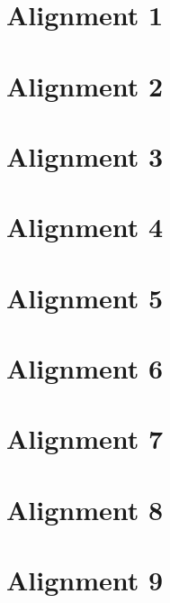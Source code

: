 \documentclass{scrartcl}
\begin{document}
\section{Alignment 1}
\label{sec:align_1}
\clearpage

\section{Alignment 2}
\label{sec:align_2}
\clearpage

\section{Alignment 3}
\label{sec:align_3}
\clearpage

\section{Alignment 4}
\label{sec:align_4}
\clearpage

\section{Alignment 5}
\label{sec:align_5}
\clearpage

\section{Alignment 6}
\label{sec:align_6}
\clearpage

\section{Alignment 7}
\label{sec:align_7}
\clearpage

\section{Alignment 8}
\label{sec:align_8}
\clearpage

\section{Alignment 9}
\label{sec:align_9}
\clearpage
\end{document}
